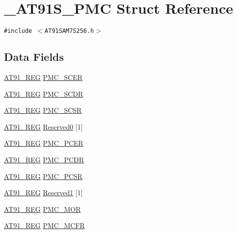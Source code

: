 \hypertarget{struct__AT91S__PMC}{
\section{\_\-AT91S\_\-PMC Struct Reference}
\label{struct__AT91S__PMC}
}
{\tt \#include $<$AT91SAM7S256.h$>$}

\subsection*{Data Fields}
\begin{CompactItemize}
\item 
\hyperlink{AT91SAM7X256_8h_712ad5a1ac1bd02f3e95a7526c283ce1}{AT91\_\-REG} \hyperlink{struct__AT91S__PMC_8b9d2ec1773c1ab2ba294d722fc44c00}{PMC\_\-SCER}
\item 
\hyperlink{AT91SAM7X256_8h_712ad5a1ac1bd02f3e95a7526c283ce1}{AT91\_\-REG} \hyperlink{struct__AT91S__PMC_528dd78ce6aa4cc56026e2dc7380282d}{PMC\_\-SCDR}
\item 
\hyperlink{AT91SAM7X256_8h_712ad5a1ac1bd02f3e95a7526c283ce1}{AT91\_\-REG} \hyperlink{struct__AT91S__PMC_b55c9303c8ea02641dc24182c544139e}{PMC\_\-SCSR}
\item 
\hyperlink{AT91SAM7X256_8h_712ad5a1ac1bd02f3e95a7526c283ce1}{AT91\_\-REG} \hyperlink{struct__AT91S__PMC_ae3bfa4a88c29f53b43ad4d6fde4b6ee}{Reserved0} \mbox{[}1\mbox{]}
\item 
\hyperlink{AT91SAM7X256_8h_712ad5a1ac1bd02f3e95a7526c283ce1}{AT91\_\-REG} \hyperlink{struct__AT91S__PMC_bfc7e835740e173465ff67a5957cd371}{PMC\_\-PCER}
\item 
\hyperlink{AT91SAM7X256_8h_712ad5a1ac1bd02f3e95a7526c283ce1}{AT91\_\-REG} \hyperlink{struct__AT91S__PMC_2c995bed4a6b1c2fbae4abbc51e63dae}{PMC\_\-PCDR}
\item 
\hyperlink{AT91SAM7X256_8h_712ad5a1ac1bd02f3e95a7526c283ce1}{AT91\_\-REG} \hyperlink{struct__AT91S__PMC_3ba02e62e84225fae0f948a38753c027}{PMC\_\-PCSR}
\item 
\hyperlink{AT91SAM7X256_8h_712ad5a1ac1bd02f3e95a7526c283ce1}{AT91\_\-REG} \hyperlink{struct__AT91S__PMC_c82dc0a86cbd07091bbd7a385dde5c16}{Reserved1} \mbox{[}1\mbox{]}
\item 
\hyperlink{AT91SAM7X256_8h_712ad5a1ac1bd02f3e95a7526c283ce1}{AT91\_\-REG} \hyperlink{struct__AT91S__PMC_60d9f7a2b18f12ca66bfc5591d871720}{PMC\_\-MOR}
\item 
\hyperlink{AT91SAM7X256_8h_712ad5a1ac1bd02f3e95a7526c283ce1}{AT91\_\-REG} \hyperlink{struct__AT91S__PMC_581053b5c3a5d9b4527f82ee1437dfc8}{PMC\_\-MCFR}

\end{CompactItemize}
